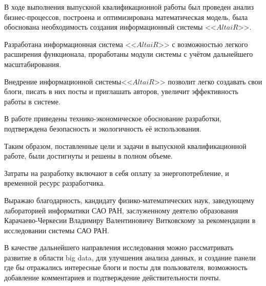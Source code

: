 В ходе выполнения выпускной квалификационной работы был проведен анализ бизнес-процессов, построена и оптимизирована математическая модель, была обоснована необходимость создания информационный системы <<$AltaiR$>>.

Разработана информационная система <<$AltaiR$>> с возможностью легкого расширения функционала, проработаны модули системы с
учётом дальнейшего масштабирования.

Внедрение информационной системы<<$AltaiR$>> позволит легко создавать свои блоги, писать в них посты и приглашать авторов, увеличит эффективность работы в системе.

В работе приведены технико-экономическое обоснование разработки, подтверждена безопасность и экологичность её использования.

Таким образом, поставленные цели и задачи в выпускной квалификационной работе, были достигнуты и решены в полном объеме.

Затраты на разработку включают в себя оплату за энергопотребление, и временной ресурс разработчика.   

Выражаю благодарность, кандидату физико-математических наук, заведующему лабораторией информатики САО РАН, заслуженному деятелю образования Карачаево-Черкесии Владимиру Валентиновичу Витковскому за рекомендации в исследовании системы САО РАН.   

В качестве дальнейшего направления исследования можно рассматривать развитие в области big data, для улучшения анализа данных, и создание панели где бы отражались интересные блоги и посты для пользователя, возможность добавление комментариев и подтверждение действительности почты.

\pagebreak